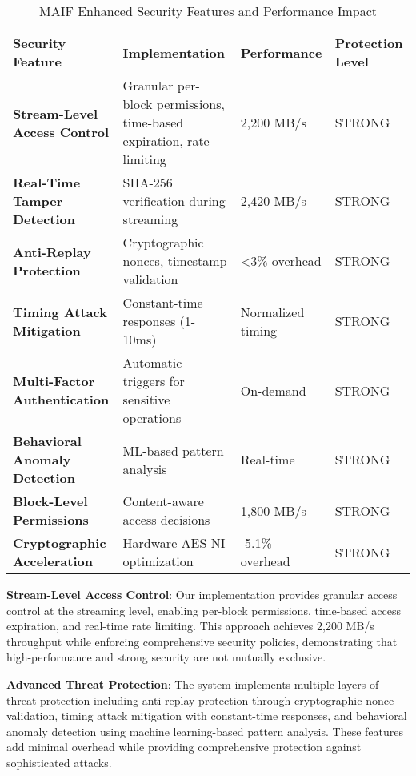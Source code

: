 \documentclass[conference]{IEEEtran}
\begin{document}
\begin{table*}[!t]
\renewcommand{\arraystretch}{1.3}
\caption{MAIF Enhanced Security Features and Performance Impact}
\label{tab:enhanced-security}
\centering
\footnotesize
\begin{tabular}{p{3.5cm}p{5cm}p{3cm}p{2.5cm}}
\toprule
\textbf{Security Feature} & \textbf{Implementation} & \textbf{Performance} & \textbf{Protection Level} \\
\midrule
\textbf{Stream-Level Access Control} & Granular per-block permissions, time-based expiration, rate limiting & 2,200 MB/s & STRONG \\
\textbf{Real-Time Tamper Detection} & SHA-256 verification during streaming & 2,420 MB/s & STRONG \\
\textbf{Anti-Replay Protection} & Cryptographic nonces, timestamp validation & <3\% overhead & STRONG \\
\textbf{Timing Attack Mitigation} & Constant-time responses (1-10ms) & Normalized timing & STRONG \\
\textbf{Multi-Factor Authentication} & Automatic triggers for sensitive operations & On-demand & STRONG \\
\textbf{Behavioral Anomaly Detection} & ML-based pattern analysis & Real-time & STRONG \\
\textbf{Block-Level Permissions} & Content-aware access decisions & 1,800 MB/s & STRONG \\
\textbf{Cryptographic Acceleration} & Hardware AES-NI optimization & -5.1\% overhead & STRONG \\
\bottomrule
\end{tabular}
\end{table*}

\textbf{Stream-Level Access Control}: Our implementation provides granular access control at the streaming level, enabling per-block permissions, time-based access expiration, and real-time rate limiting. This approach achieves 2,200 MB/s throughput while enforcing comprehensive security policies, demonstrating that high-performance and strong security are not mutually exclusive.

\textbf{Advanced Threat Protection}: The system implements multiple layers of threat protection including anti-replay protection through cryptographic nonce validation, timing attack mitigation with constant-time responses, and behavioral anomaly detection using machine learning-based pattern analysis. These features add minimal overhead while providing comprehensive protection against sophisticated attacks.
\end{document}
